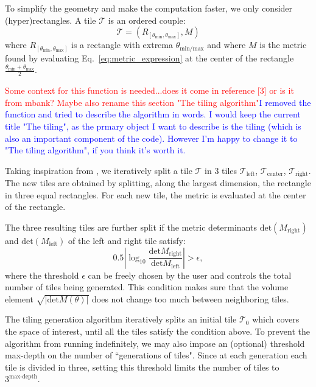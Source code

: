 \documentclass[twocolumn,showpacs,preprintnumbers,nofootinbib,prd,
superscriptaddress,10pt]{revtex4-2}
\begin{document}
To simplify the geometry and make the computation faster, we only consider (hyper)rectangles. A tile $\mathcal{T}$ is an ordered couple:
\begin{equation} \label{eq:tile}
	\mathcal{T} = \left(R_{[\theta_\text{min}, \theta_\text{max}]}, M \right)
\end{equation}
where $R_{[\theta_\text{min}, \theta_\text{max}]}$ is a rectangle with extrema $\theta_{\text{min/max}}$ and where $M$ is the metric found by evaluating Eq.~\eqref{eq:metric_expression} at the center of the rectangle $\frac{\theta_\text{min}+\theta_\text{max}}{2}$.

\textcolor{red}{Some context for this function is needed...does it come in reference [3] or is it from mbank? Maybe also rename this section "The tiling algorithm"}\textcolor{blue}{I removed the function and tried to describe the algorithm in words. I would keep the current title "The tiling", as the prmary object I want to describe is the tiling (which is also an important component of the code). However I'm happy to change it to "The tiling algorithm", if you think it's worth it.}

Taking inspiration from \cite{Hanna:2022zpk}, we iteratively split a tile $\mathcal{T}$ in 3 tiles $\mathcal{T}_\text{left}$, $\mathcal{T}_\text{center}$, $\mathcal{T}_\text{right}$. The new tiles are obtained by splitting, along the largest dimension, the rectangle in three equal rectangles. For each new tile, the metric is evaluated at the center of the rectangle.

The three resulting tiles are further split if the metric determinants $\text{det}\left(M_\text{right}\right)$ and $\text{det}\left(M_\text{left}\right)$ of the left and right tile satisfy:
\begin{equation}\label{eq:stop_tiling}
	0.5\left|\log_{\textrm{10}}\frac{\text{det} M_\text{right}}{\text{det}M_\text{left}}\right| > \epsilon,
\end{equation}
where the threshold $\epsilon$ can be freely chosen by the user and controls the total number of tiles being generated.
This condition makes sure that the volume element $\sqrt{|\text{det}M(\theta)|}$ does not change too much between neighboring tiles.

The tiling generation algorithm iteratively splits an initial tile $\mathcal{T}_{0}$ which covers the space of interest, until all the tiles satisfy the condition above.
To prevent the algorithm from running indefinitely, we may also impose an (optional) threshold max-depth on the number of ``generations of tiles". Since at each generation each tile is divided in three, setting this threshold limits the number of tiles to $3^{\textrm{max-depth}}$.
\end{document}
